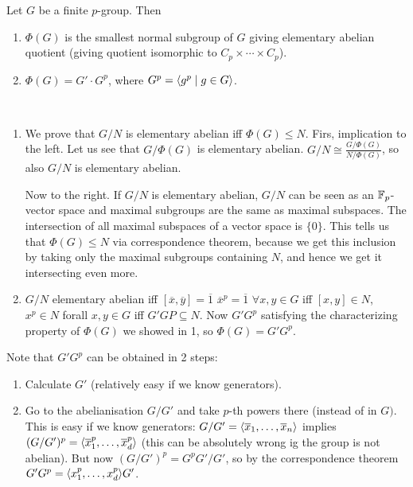\documentclass[twoside, 11pt]{article}
\begin{document}
\begin{teorema}
Let $G$ be a finite $p$-group. Then
\begin{enumerate}
\item $\Phi(G)$ is the smallest normal subgroup of $G$ giving elementary abelian quotient (giving quotient isomorphic to $C_p\times\cdots\times C_p$).
\item $\Phi(G)=G'\cdot G^p$, where $G^p=\langle{g^p\mid g\in G}\rangle$. 
\end{enumerate}
\end{teorema}
 \begin{dem}\
 \begin{enumerate}
 \item We prove that $G/N$ is elementary abelian iff $\Phi(G)\leq N$. Firs, implication to the left. Let us see that $G/\Phi(G)$ is elementary abelian. $G/N\cong \frac{G/\Phi(G)}{N/\Phi(G)}$, so also $G/N$ is elementary abelian. 
 
 Now to the right. If $G/N$ is elementary abelian, $G/N$ can be seen as an $\mathbb{F}_p$-vector space and maximal subgroups are the same as maximal subspaces. The intersection of all maximal subspaces of a vector space is $\{0\}$. This tells us that $\Phi(G)\leq N$ via correspondence theorem, because we get this inclusion by taking only the maximal subgroups containing $N$, and hence we get it intersecting even more. 
 
 \item $G/N$ elementary abelian iff $[\overline{x},\overline{y}]=\overline{1}$ $\overline{x}^p=\overline{1}$ $\forall x,y\in G$ iff $[x,y]\in N$, $x^p\in N$ forall $x,y\in G$ iff $G'GP\subseteq N$. Now $G'G^p$ satisfying the characterizing property of $\Phi(G)$ we showed in 1, so $\Phi(G)=G'G^p$. 
 \end{enumerate}
 \end{dem}
 
 Note that $G'G^p$ can be obtained in 2 steps:
 \begin{enumerate}
 \item Calculate $G'$ (relatively easy if we know generators).
 \item Go to the abelianisation $G/G'$ and take $p$-th powers there (instead of in $G)$. This is easy if we know generators: $G/G'=\langle{\overline{x}_1,\dots, \overline{x}_n}\rangle$ implies $(G/G')^p=\langle{\overline{x}^p_1,\dots, \overline{x}_d^p}\rangle$ (this can be absolutely wrong ig the group is not abelian). But now $(G/G')^p=G^pG'/G'$, so by the correspondence theorem $G'G^p=\langle{x_1^p,\dots, x_d^p}\rangle G'$. 
 \end{enumerate}
 
\end{document}
